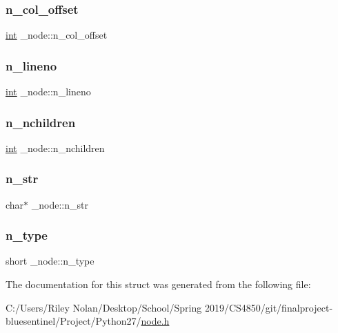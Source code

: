 \subsubsection{\texorpdfstring{n\_col\_offset}{n\_col\_offset}}
{\footnotesize\ttfamily \mbox{\hyperlink{warnings_8h_a74f207b5aa4ba51c3a2ad59b219a423b}{int}} \+\_\+node\+::n\+\_\+col\+\_\+offset}

\mbox{\label{struct__node_a0e7e01a2a66d8b94029ed2dcdadb139f}} 
\subsubsection{\texorpdfstring{n\_lineno}{n\_lineno}}
{\footnotesize\ttfamily \mbox{\hyperlink{warnings_8h_a74f207b5aa4ba51c3a2ad59b219a423b}{int}} \+\_\+node\+::n\+\_\+lineno}

\mbox{\label{struct__node_acf53660d344ef4ecfacb77c3658848ea}} 
\subsubsection{\texorpdfstring{n\_nchildren}{n\_nchildren}}
{\footnotesize\ttfamily \mbox{\hyperlink{warnings_8h_a74f207b5aa4ba51c3a2ad59b219a423b}{int}} \+\_\+node\+::n\+\_\+nchildren}

\mbox{\label{struct__node_af35079752ee060258bf77220fba1b166}} 
\subsubsection{\texorpdfstring{n\_str}{n\_str}}
{\footnotesize\ttfamily char$\ast$ \+\_\+node\+::n\+\_\+str}

\mbox{\label{struct__node_a1e33106d8300c321ff2f0f42e66de92d}} 
\subsubsection{\texorpdfstring{n\_type}{n\_type}}
{\footnotesize\ttfamily short \+\_\+node\+::n\+\_\+type}



The documentation for this struct was generated from the following file\+:\begin{DoxyCompactItemize}
\item 
C\+:/\+Users/\+Riley Nolan/\+Desktop/\+School/\+Spring 2019/\+C\+S4850/git/finalproject-\/bluesentinel/\+Project/\+Python27/\mbox{\hyperlink{node_8h}{node.\+h}}\end{DoxyCompactItemize}
